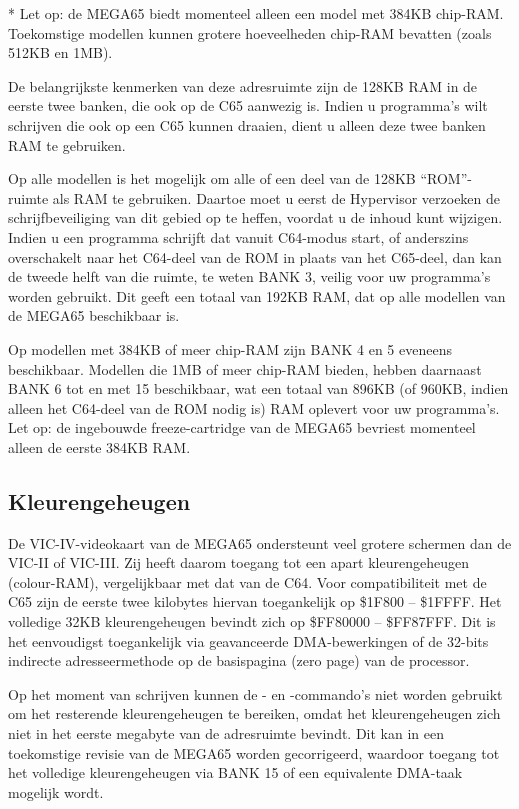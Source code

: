 * Let op: de MEGA65 biedt momenteel alleen een model met 384KB chip-RAM. Toekomstige modellen kunnen grotere hoeveelheden chip-RAM bevatten (zoals 512KB en 1MB).

De belangrijkste kenmerken van deze adresruimte zijn de 128KB RAM in de eerste twee banken, die ook op de C65 aanwezig is. Indien u programma's wilt schrijven die ook op een C65 kunnen draaien, dient u alleen deze twee banken RAM te gebruiken.

Op alle modellen is het mogelijk om alle of een deel van de 128KB ``ROM''-ruimte als RAM te gebruiken. Daartoe moet u eerst de Hypervisor verzoeken de schrijfbeveiliging van dit gebied op te heffen, voordat u de inhoud kunt wijzigen. Indien u een programma schrijft dat vanuit C64-modus start, of anderszins overschakelt naar het C64-deel van de ROM in plaats van het C65-deel, dan kan de tweede helft van die ruimte, te weten BANK 3, veilig voor uw programma's worden gebruikt. Dit geeft een totaal van 192KB RAM, dat op alle modellen van de MEGA65 beschikbaar is.

Op modellen met 384KB of meer chip-RAM zijn BANK 4 en 5 eveneens beschikbaar. Modellen die 1MB of meer chip-RAM bieden, hebben daarnaast BANK 6 tot en met 15 beschikbaar, wat een totaal van 896KB (of 960KB, indien alleen het C64-deel van de ROM nodig is) RAM oplevert voor uw programma's. Let op: de ingebouwde freeze-cartridge van de MEGA65 bevriest momenteel alleen de eerste 384KB RAM.

\subsection{Kleurengeheugen}

De VIC-IV-videokaart van de MEGA65 ondersteunt veel grotere schermen dan de VIC-II of VIC-III. Zij heeft daarom toegang tot een apart kleurengeheugen (colour-RAM), vergelijkbaar met dat van de C64. Voor compatibiliteit met de C65 zijn de eerste twee kilobytes hiervan toegankelijk op \$1F800 -- \$1FFFF. Het volledige 32KB kleurengeheugen bevindt zich op \$FF80000 -- \$FF87FFF. Dit is het eenvoudigst toegankelijk via geavanceerde DMA-bewerkingen of de 32-bits indirecte adresseermethode op de basispagina (zero page) van de processor.

Op het moment van schrijven kunnen de - en -commando's niet worden gebruikt om het resterende kleurengeheugen te bereiken, omdat het kleurengeheugen zich niet in het eerste megabyte van de adresruimte bevindt. Dit kan in een toekomstige revisie van de MEGA65 worden gecorrigeerd, waardoor toegang tot het volledige kleurengeheugen via BANK 15 of een equivalente DMA-taak mogelijk wordt.


